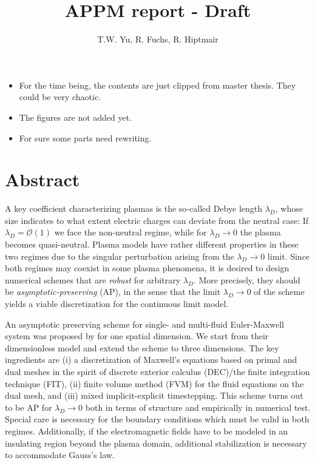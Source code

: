 \documentclass{article}
\title{APPM report - Draft}
\author{T.W. Yu, R. Fuchs, R. Hiptmair}
\newcommand{\todobox}[1]{
    \begin{tcolorbox}[title=TODO list, colback=blue!10, colframe=blue]
        #1
    \end{tcolorbox}
}
\begin{document}
\maketitle

\todobox{
    \begin{itemize}
        \item For the time being, the contents are just clipped from master thesis. They could be very chaotic.
        \item The figures are not added yet.
        \item For sure some parts need rewriting.
    \end{itemize}
}

\section*{Abstract}
A key coefficient characterizing plasmas is the so-called Debye length $\lambda_D$, whose size indicates to what extent electric charges can deviate from the neutral case: If $\lambda_D = \mathcal{O}(1)$ we face the non-neutral regime, while for $\lambda_D\to 0$ the plasma becomes quasi-neutral. Plasma models have rather different properties in these two regimes due to the singular perturbation arising from the $\lambda_D\to 0$ limit.
Since both regimes may coexist in some plasma phenomena, it is desired to design numerical schemes that are \emph{robust} for arbitrary $\lambda_D$. More precisely, they should be \emph{asymptotic-preserving} (AP), in the sense that the limit $\lambda_D\to 0$ of the scheme yields a viable discretization for the continuous limit model.

An asymptotic preserving scheme for single- and multi-fluid Euler-Maxwell system was proposed by \cite{degond_2012} for one spatial dimension. We start from their dimensionless model and extend the scheme to three dimensions. The key ingredients are (i) a discretization of Maxwell's equations based on primal and dual meshes in the spirit of discrete exterior calculus (DEC)/the finite integration technique (FIT), (ii) finite volume method (FVM) for the fluid equations on the dual mesh, and (iii) mixed implicit-explicit timestepping. This scheme turns out to be AP for $\lambda_D\to 0$ both in terms of structure and empirically in numerical test. Special care is necessary for the boundary conditions which must be valid in both regimes. Additionally, if the electromagnetic fields have to be modeled in an insulating region beyond the plasma domain, additional stabilization is necessary to accommodate Gauss's law.
\end{document}
